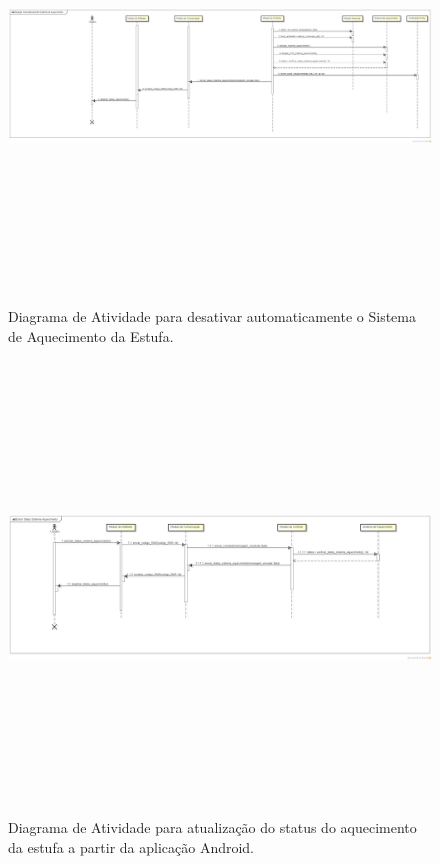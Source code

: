 \documentclass{report}
\begin{document}
	\begin{landscape}
	    \begin{figure}[H]
		\includegraphics[width=\linewidth, height = 12cm]{pictures/desligar_automaticamente_aquecimento.png}
		\caption{Diagrama de Atividade para desativar automaticamente o Sistema de Aquecimento da Estufa.}
		\label{figure:desligar_automaticamente_aquecimento}
	    \end{figure}
	\end{landscape}
	
	
	\begin{landscape}
	    \begin{figure}[[H]
		\includegraphics[width=\linewidth, height = 12cm]{pictures/status_sistema_aquecimento.png}
		\caption{Diagrama de Atividade para atualização do status do aquecimento da estufa a partir da aplicação Android.}
		\label{figure:status_sistema_aquecimento}
	    \end{figure}
	\end{landscape}
	
\end{document}
